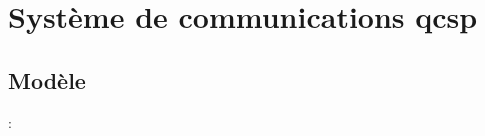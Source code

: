\documentclass[../main.tex]{subfiles}
\begin{document}
\section[Système de communications QCSP]{Système de communications \acrshort{qcsp}}


\subsection{Modèle}

\begin{frame}{\secname : \subsecname}
  \begin{overlayarea}{\linewidth}{0.25\textheight}
    \resizebox{\linewidth}{!}{
      
    }
  \end{overlayarea}


\end{frame}
\end{document}
